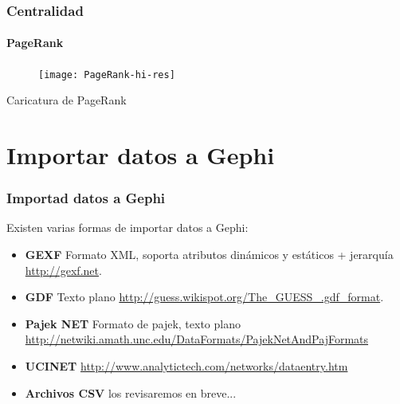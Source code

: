 \documentclass[10pt,handout]{beamer}
\begin{document}
\begin{frame}
\frametitle{Centralidad}
\framesubtitle{PageRank}
\begin{figure}
\centering
\texttt{[image: PageRank-hi-res]}
\end{figure}
{\footnotesize Caricatura de PageRank}
\end{frame}

\section{Importar datos a Gephi}

\begin{frame}
\frametitle{Importad datos a Gephi}
Existen varias formas de importar datos a Gephi:
\begin{itemize}
\item {\bf GEXF} Formato XML, soporta atributos din\'amicos y est\'aticos + jerarqu\'ia \url{http://gexf.net}.
\item {\bf GDF} Texto plano \url{http://guess.wikispot.org/The_GUESS_.gdf_format}.
\item {\bf Pajek NET} Formato de pajek, texto plano \url{http://netwiki.amath.unc.edu/DataFormats/PajekNetAndPajFormats}
\item {\bf UCINET} \url{http://www.analytictech.com/networks/dataentry.htm}
\item {\bf Archivos CSV} los revisaremos en breve...
\end{itemize}
\end{frame}
\end{document}
